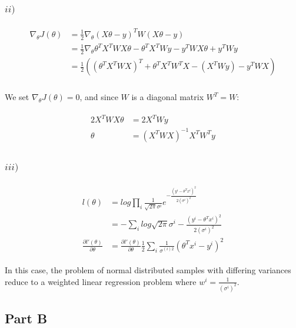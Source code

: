 \documentclass[11pt]{article}
\begin{document}
\subsubsection*{$ii)$ }
\begin{align}
	\begin{split}
		\nabla_\theta J(\theta) &= \frac{1}{2} \nabla_\theta (X\theta-y)^TW(X\theta-y) \\
													  &= \frac{1}{2} \nabla_\theta \theta^TX^TWX\theta - \theta^TX^TWy - y^TWX\theta + y^TWy \\
														&= \frac{1}{2} ( (\theta^TX^TWX)^T + \theta^TX^TW^TX- (X^TWy) - y^TWX ) \\
		\end{split}
\end{align}

We set $\nabla_\theta J(\theta)=0$, and since $W$ is a diagonal matrix $W^T = W$:

\begin{align}
	\begin{split}
		2X^TWX\theta &= 2X^TWy \\
					\theta &= (X^TWX)^{-1}X^TW^Ty 
		\end{split}
\end{align}

\subsubsection*{$iii)$ }

\begin{align}
	\begin{split}
		l(\theta) &= log \prod_i \frac{1}{\sqrt{2\pi}\sigma^{i}}e^{-\frac{(y^{i}-\theta^Tx^{i})^2}{2(\sigma^{i})^2}} \\
							&= - \sum_i log \sqrt{2\pi}\sigma^{i} - \frac{(y^{i}-\theta^Tx^{i})^2}{2(\sigma^{i})^2} \\
		\frac{\partial l'(\theta)}{\partial \theta} &= \frac{\partial l'(\theta)}{\partial \theta} \frac{1}{2} \sum_i \frac{1}{\sigma^{(i)2}}(\theta^Tx^{i} - y^{i})^2  	
	\end{split}
\end{align}

In this case, the problem of normal distributed samples with differing variances reduce to a 
weighted linear regression problem where $w^{i}=\frac{1}{(\sigma^{i})^2}$.


\subsection*{Part B}
\end{document}

